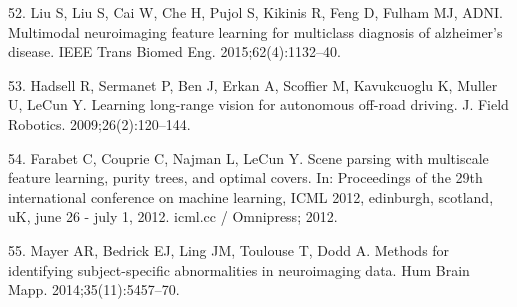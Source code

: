 \documentclass[11pt,]{article}
\begin{document}
\hypertarget{ref-Liu:2015aa}{}
52. Liu S, Liu S, Cai W, Che H, Pujol S, Kikinis R, Feng D, Fulham MJ,
ADNI. Multimodal neuroimaging feature learning for multiclass diagnosis
of alzheimer's disease. IEEE Trans Biomed Eng. 2015;62(4):1132--40.

\hypertarget{ref-HadsellSBESKML09}{}
53. Hadsell R, Sermanet P, Ben J, Erkan A, Scoffier M, Kavukcuoglu K,
Muller U, LeCun Y. Learning long-range vision for autonomous off-road
driving. J. Field Robotics. 2009;26(2):120--144.

\hypertarget{ref-FarabetCNL12}{}
54. Farabet C, Couprie C, Najman L, LeCun Y. Scene parsing with
multiscale feature learning, purity trees, and optimal covers. In:
Proceedings of the 29th international conference on machine learning,
ICML 2012, edinburgh, scotland, uK, june 26 - july 1, 2012. icml.cc /
Omnipress; 2012.

\hypertarget{ref-Mayer:2014aa}{}
55. Mayer AR, Bedrick EJ, Ling JM, Toulouse T, Dodd A. Methods for
identifying subject-specific abnormalities in neuroimaging data. Hum
Brain Mapp. 2014;35(11):5457--70.
\end{document}
